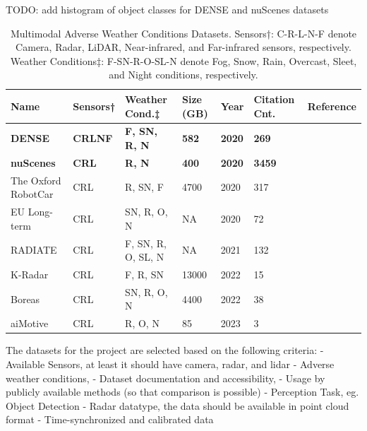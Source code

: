 \documentclass[report.tex]{subfiles}
\begin{document}
    TODO: add histogram of object classes for DENSE and nuScenes datasets

    \begin{table}[!ht]
        \centering
        \caption{Multimodal Adverse Weather Conditions Datasets. Sensors†: C-R-L-N-F denote Camera, Radar, LiDAR, Near-infrared, and Far-infrared sensors, respectively. Weather Conditions‡: F-SN-R-O-SL-N denote Fog, Snow, Rain, Overcast, Sleet, and Night conditions, respectively.}
        \begin{tabular}{|l|l|l|l|l|l|l|}
        \hline
            \textbf{Name} & \textbf{Sensors†} & \textbf{Weather Cond.‡} & \textbf{Size (GB)} & \textbf{Year} & \textbf{Citation Cnt.} & \textbf{Reference} \\ \hline
            \textbf{DENSE} & \textbf{CRLNF} & \textbf{F, SN, R, N} & \textbf{582} & \textbf{2020} & \textbf{269} & \textbf{\cite{bijelic2020seeing}} \\ \hline
            \textbf{nuScenes} & \textbf{CRL} & \textbf{R, N} & \textbf{400} & \textbf{2020} & \textbf{3459} & \textbf{\cite{caesar2020nuscenes}} \\ \hline
            The Oxford RobotCar & CRL & R, SN, F & 4700 & 2020 & 317 & \cite{barnes2020oxford} \\ \hline
            EU Long-term & CRL & SN, R, O, N & NA & 2020 & 72 & \cite{yan2020eu} \\ \hline
            RADIATE & CRL & F, SN, R, O, SL, N & NA & 2021 & 132 & \cite{sheeny2021radiate} \\ \hline
            K-Radar & CRL & F, R, SN & 13000 & 2022 & 15 & \cite{Paek2022Jun} \\ \hline
            Boreas & CRL & SN, R, O, N & 4400 & 2022 & 38 & \cite{burnett2022boreas} \\ \hline
            aiMotive & CRL & R, O, N & 85 & 2023 & 3 & \cite{matuszka2022aimotive} \\ \hline
        \end{tabular}
        \label{datasets}
    \end{table}


    The datasets for the project are selected based on the following criteria:
    - Available Sensors, at least it should have camera, radar, and lidar
    - Adverse weather conditions,
    - Dataset documentation and accessibility,
    - Usage by publicly available methods (so that comparison is possible)
    - Perception Task, eg. Object Detection
    - Radar datatype, the data should be available in point cloud format
    - Time-synchronized and calibrated data
\end{document}
